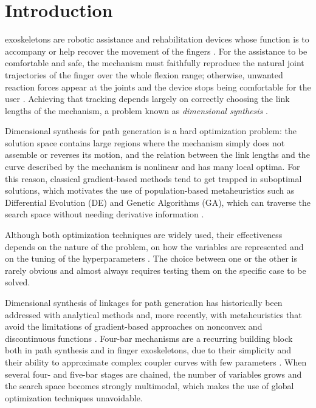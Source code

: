 \section{Introduction}
 exoskeletons are robotic assistance and rehabilitation
devices whose function is to accompany or help recover the movement of the
fingers \cite{ref_exo_review}. For the assistance to be comfortable and safe,
the mechanism must faithfully reproduce the natural joint trajectories of the
finger over the whole flexion range; otherwise, unwanted reaction forces appear
at the joints and the device stops being comfortable for the user
\cite{ref_fourbar_nat}. Achieving that tracking depends largely on correctly
choosing the link lengths of the mechanism, a problem known as
\emph{dimensional synthesis} \cite{ref_de_fourbar}.

Dimensional synthesis for path generation is a hard optimization problem: the
solution space contains large regions where the mechanism simply does not
assemble or reverses its motion, and the relation between the link lengths and
the curve described by the mechanism is nonlinear and has many local optima. For
this reason, classical gradient-based methods tend to get trapped in suboptimal
solutions, which motivates the use of population-based metaheuristics such as
Differential Evolution (DE) and Genetic Algorithms (GA), which can traverse the
search space without needing derivative information
\cite{ref_de_fourbar,ref_tlbo}.

Although both optimization techniques are widely used, their effectiveness
depends on the nature of the problem, on how the variables are represented and on
the tuning of the hyperparameters \cite{ref_ga_pso_de,ref_de_vs_ga}. The choice
between one or the other is rarely obvious and almost always requires testing
them on the specific case to be solved.

Dimensional synthesis of linkages for path generation has historically been
addressed with analytical methods and, more recently, with metaheuristics that
avoid the limitations of gradient-based approaches on nonconvex and discontinuous
functions \cite{ref_de_fourbar,ref_tlbo}. Four-bar mechanisms are a recurring
building block both in path synthesis and in finger exoskeletons, due to their
simplicity and their ability to approximate complex coupler curves with few
parameters \cite{ref_fourbar_nat,ref_exo_stephenson}. When several four- and
five-bar stages are chained, the number of variables grows and the search space
becomes strongly multimodal, which makes the use of global optimization
techniques unavoidable.

